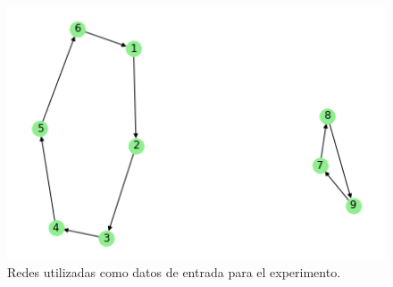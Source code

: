 \begin{figure}[h]
   \begin{center}
     \includegraphics{img/prueba_3_no_conexa.png} 
  \end{center}
\caption{Redes utilizadas como datos de entrada para el experimento.} \label{fig:exp3-webs}
\end{figure}